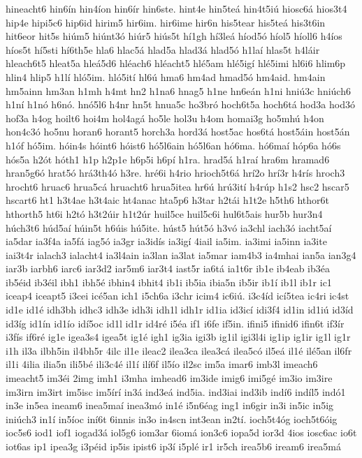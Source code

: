 {hineacht6
hin6ín
hin4íon
hin6ír
hin6ste.
hint4e
hin5teá
hin4t5iú
hiosc6á
hios3t4
hip4e
hipi5c6
hip6id
hirim5
hir6im.
hir6ime
hir6n
his5tear
his5teá
his3t6in
hit6eor
hit5s
hiúm5
hiúnt3ó
hiúr5
hiús5t
hí1gh
hí3leá
híod5ó
híol5
híoll6
h4íos
híos5t
hí5sti
hí6th5e
hla6
hlac5á
hlad5a
hlad3á
hlad5ó
h1laí
hlas5t
h4láir
hleach6t5
hleat5a
hleá5d6
hléach6
hléacht5
hlé5am
hlé5igí
hlé5imi
hl6i6
hlim6p
hlin4
hlip5
h1lí
hló5im.
hló5ití
hl6ú
hma6
hm4ad
hmad5ó
hm4aid.
hm4ain
hm5ainn
hm3an
h1mh
h4mt
hn2
h1na6
hnag5
h1ne
hn6eán
h1ni
hniú3c
hniúch6
h1ní
h1nó
h6nó.
hnó5l6
h4nr
hn5t
hnua5c
ho3bró
hoch6t5a
hoch6tá
hod3a
hod3ó
hof3a
h4og
hoilt6
hoi4m
hol4agá
ho5le
hol3u
h4om
homai3g
ho5mhú
h4on
hon4c3ó
ho5nu
horan6
horant5
horch3a
hord3á
host5ac
hos6tá
host5áin
host5án
h1óf
hó5im.
hóin4s
hóint6
hóist6
hó5l6ain
hó5l6an
hó6ma.
hó6maí
hóp6a
hó6s
hós5a
h2ót
hóth1
h1p
h2p1e
h6p5i
h6pí
h1ra.
hrad5á
h1raí
hra6m
hramad6
hran5g6ó
hrat5ó
hrá3th4ó
h3re.
hré6i
h4rio
hrioch5t6á
hrí2o
hrí3r
h4rís
hroch3
hrocht6
hruac6
hrua5cá
hruacht6
hrua5itea
hr6ú
hrú3ití
h4rúp
h1s2
hsc2
hscar5
hscart6
ht1
h3t4ae
h3t4aic
ht4anac
hta5p6
h3tar
h2tái
h1t2e
h5th6
hthor6t
hthorth5
ht6i
h2tó
h3t2úir
h1t2úr
huil5ce
huil5c6i
hul6t5ais
hur5b
hur3n4
húch3t6
húd5aí
húin5t
h6úis
hú5ite.
húst5
hút5ó
h3vó
ia3chl
iach3ó
iacht5aí
ia5dar
ia3f4a
ia5fá
iag5ó
ia3gr
ia3idís
ia3igí
4iail
ia5im.
ia3imi
ia5inn
ia3ite
iai3t4r
ialach3
ialacht4
ia3l4ain
ia3lan
ia3lat
ia5mar
iam4b3
ia4mhai
ian5a
ian3g4
iar3b
iarbh6
iarc6
iar3d2
iar5m6
iar3t4
iast5r
ia6tá
ia1t6r
ib1e
ib4eab
ib3éa
ib5éid
ib3éil
ibh1
ibh5é
ibhin4
ibhit4
ib1i
ib5ia
ibia5n
ib5ir
ib1í
ib1l
ib1r
ic1
iceap4
iceapt5
i3cei
icé5an
ich1
i5ch6a
i3chr
icim4
ic6iú.
i3c4íd
icí5tea
ic4ri
ic4st
id1e
id1é
idh3bh
idhc3
idh3e
idh3i
idh1l
idh1r
id1ia
id3icí
idi3f4
id1in
id1iú
id3íd
id3íg
id1ín
id1ío
idí5oc
id1l
id1r
id4ré
i5éa
if1
i6fe
if5in.
ifini5
ifinid6
ifin6t
if3ír
i3fís
if6ré
ig1e
igea3s4
igea5t
ig1é
igh1
ig3ia
igi3b
ig1il
igi3l4i
ig1ip
ig1ir
ig1l
ig1r
i1h
il3a
ilbh5in
il4bh5r
4ilc
il1e
ileac2
ilea3ca
ilea3cá
ilea5có
il5eá
il1é
ilé5an
il6fr
il1i
4ilia
ilia5n
ili5bé
ili3c4é
il1í
ilí6f
il5ío
il2sc
im5a
imar6
imb3l
imeach6
imeacht5
im3éi
2img
imh1
i3mha
imhead6
im3ide
imig6
imi5gé
im3io
im3ire
im3irn
im3irt
im5isc
im5írí
in3á
ind3eá
ind5ia.
ind3iai
ind3ib
indí6
indíl5
indó1
in3e
in5ea
ineam6
inea5maí
inea3mó
in1é
i5n6éag
ing1
in6gir
in3i
in5ic
in5ig
iniúch3
in1í
in5íoc
iní6t
6innis
in3o
in4scn
int3ean
in2tí.
ioch5t4óg
ioch5t6óig
ioc5s6
iod1
iof1
iogad3á
iol5g6
iom3ar
6iomá
ion3c6
iopa5d
ior3d
4ios
iosc6ac
io6t
iot6as
ip1
ipea3g
i3péid
ip5is
ipist6
ip3í
i5plé
ir1
ir5ch
irea5b6
iream6
irea5má
}
